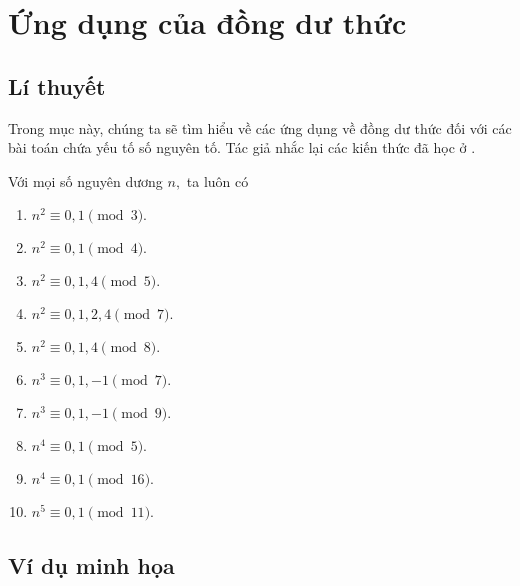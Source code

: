 \section{Ứng dụng của đồng dư thức}

\subsection{Lí thuyết}

Trong mục này, chúng ta sẽ tìm hiểu về các ứng dụng về đồng dư thức đối với các bài toán chứa yếu tố số nguyên tố. Tác giả nhắc lại các kiến thức đã học ở .

\begin{light}
Với mọi số nguyên dương $n,$ ta luôn có
\begin{multicols}{2}
\begin{enumerate}
    \item $n^2\equiv 0,1\pmod{3}.$
    \item $n^2\equiv 0,1\pmod{4}.$
    \item $n^2\equiv 0,1,4\pmod{5}.$   
    \item $n^2\equiv 0,1,2,4\pmod{7}.$    
    \item $n^2\equiv 0,1,4\pmod{8}.$    
    \item $n^3\equiv 0,1,-1\pmod{7}.$ 
    \item $n^3\equiv 0,1,-1\pmod{9}.$    
    \item $n^4\equiv 0,1\pmod{5}.$    
    \item $n^4\equiv 0,1\pmod{16}.$    
    \item $n^5\equiv 0,1\pmod{11}.$    
\end{enumerate}
\end{multicols}    
\end{light}

\subsection{Ví dụ minh họa}

